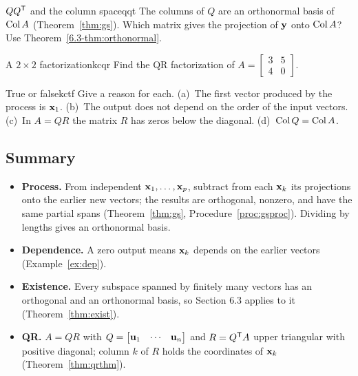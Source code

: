 \documentclass[11pt]{article}
\begin{document}
\begin{think}{$QQ^{\mathsf T}$ and the column space}{qqt}
The columns of $Q$ are an orthonormal basis of $\operatorname{Col} A$ (Theorem~\ref{thm:gs}). Which matrix gives the projection of $\mathbf{y}$ onto $\operatorname{Col} A$? Use Theorem~\ref{6.3-thm:orthonormal}.
\end{think}

\begin{kc}{A $2\times2$ factorization}{kcqr}
Find the QR factorization of $A=\begin{bmatrix}3&5\\4&0\end{bmatrix}$.
\end{kc}

\begin{kc}{True or false}{kctf}
Give a reason for each. (a)~The first vector produced by the process is $\mathbf{x}_1$. (b)~The output does not depend on the order of the input vectors. (c)~In $A=QR$ the matrix $R$ has zeros below the diagonal. (d)~$\operatorname{Col} Q=\operatorname{Col} A$.
\end{kc}

\subsection*{Summary}
\begin{itemize}
  \item \textbf{Process.} From independent $\mathbf{x}_1,\dots,\mathbf{x}_p$, subtract from each $\mathbf{x}_k$ its projections onto the earlier new vectors; the results are orthogonal, nonzero, and have the same partial spans (Theorem~\ref{thm:gs}, Procedure~\ref{proc:gsproc}). Dividing by lengths gives an orthonormal basis.
  \item \textbf{Dependence.} A zero output means $\mathbf{x}_k$ depends on the earlier vectors (Example~\ref{ex:dep}).
  \item \textbf{Existence.} Every subspace spanned by finitely many vectors has an orthogonal and an orthonormal basis, so Section 6.3 applies to it (Theorem~\ref{thm:exist}).
  \item \textbf{QR.} $A=QR$ with $Q=\begin{bmatrix}\mathbf{u}_1&\cdots&\mathbf{u}_n\end{bmatrix}$ and $R=Q^{\mathsf T} A$ upper triangular with positive diagonal; column $k$ of $R$ holds the coordinates of $\mathbf{x}_k$ (Theorem~\ref{thm:qrthm}).
\end{itemize}
\end{document}
